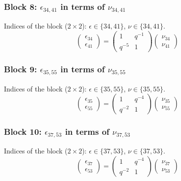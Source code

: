 \subsubsection{Block 8: $\epsilon_{34, 41}$ in terms of $\nu_{34, 41}$}
Indices of the block ($2\times 2$): $\epsilon \in \{34, 41\}$, $\nu \in \{34, 41\}$.
\[
\begin{pmatrix}
\epsilon_{34} \\
\epsilon_{41}
\end{pmatrix}
=
\begin{pmatrix}
1 & q^{-1} \\
q^{-5} & 1
\end{pmatrix}
\begin{pmatrix}
\nu_{34} \\
\nu_{41}
\end{pmatrix}
\]

\subsubsection{Block 9: $\epsilon_{35, 55}$ in terms of $\nu_{35, 55}$}
Indices of the block ($2\times 2$): $\epsilon \in \{35, 55\}$, $\nu \in \{35, 55\}$.
\[
\begin{pmatrix}
\epsilon_{35} \\
\epsilon_{55}
\end{pmatrix}
=
\begin{pmatrix}
1 & q^{-4} \\
q^{-2} & 1
\end{pmatrix}
\begin{pmatrix}
\nu_{35} \\
\nu_{55}
\end{pmatrix}
\]

\subsubsection{Block 10: $\epsilon_{37, 53}$ in terms of $\nu_{37, 53}$}
Indices of the block ($2\times 2$): $\epsilon \in \{37, 53\}$, $\nu \in \{37, 53\}$.
\[
\begin{pmatrix}
\epsilon_{37} \\
\epsilon_{53}
\end{pmatrix}
=
\begin{pmatrix}
1 & q^{-4} \\
q^{-2} & 1
\end{pmatrix}
\begin{pmatrix}
\nu_{37} \\
\nu_{53}
\end{pmatrix}
\]

